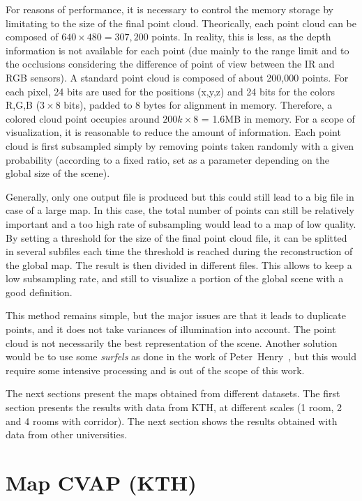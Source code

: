 For reasons of performance, it is necessary to control the memory storage by limitating to the size of the final point cloud. Theorically, each point cloud can be composed of $640\times480 = 307,200$ points. In reality, this is less, as the depth information is not available for each point (due mainly to the range limit and to the occlusions considering the difference of point of view between the IR and RGB sensors). A standard point cloud is composed of about 200,000 points. For each pixel, 24 bits are used for the positions (x,y,z) and 24 bits for the colors R,G,B ($3\times8$ bits), padded to 8 bytes for alignment in memory. Therefore, a colored cloud point occupies around $200k\times8$ = 1.6MB in memory. For a scope of visualization, it is reasonable to reduce the amount of information. Each point cloud is first subsampled simply by removing points taken randomly with a given probability (according to a fixed ratio, set as a parameter depending on the global size of the scene).

Generally, only one output file is produced but this could still lead to a big file in case of a large map. In this case, the total number of points can still be relatively important and a too high rate of subsampling would lead to a map of low quality. By setting a threshold for the size of the final point cloud file, it can be splitted in several subfiles each time the threshold is reached during the reconstruction of the global map. The result is then divided in different files. This allows to keep a low subsampling rate, and still to visualize a portion of the global scene with a good definition.

This method remains simple, but the major issues are that it leads to duplicate points, and it does not take variances of illumination into account. The point cloud is not necessarily the best representation of the scene. Another solution would be to use some \emph{surfels} as done in the work of Peter~Henry~\cite{Intel_RGBD_2010}, but this would require some intensive processing and is out of the scope of this work.

The next sections present the maps obtained from different datasets. The first section presents the results with data from KTH, at different scales (1 room, 2 and 4 rooms with corridor). The next section shows the results obtained with data from other universities.

\section{Map CVAP (KTH)}


